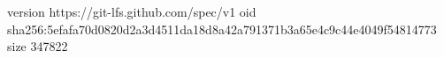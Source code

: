 version https://git-lfs.github.com/spec/v1
oid sha256:5efafa70d0820d2a3d4511da18d8a42a791371b3a65e4c9c44e4049f54814773
size 347822
